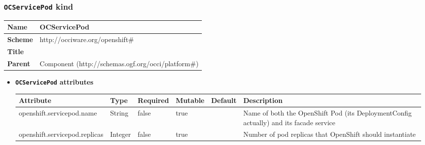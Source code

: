 \subsubsection{\texttt{OCServicePod} kind}
\begin{center}
\begin{tabular}{|l|l|}
  \hline
  \textbf{Name} & OCServicePod \\
  \hline  
  \textbf{Scheme} & http://occiware.org/openshift\# \\
  \hline
  \textbf{Title} &  \\
  \hline
  \textbf{Parent} & Component (http://schemas.ogf.org/occi/platform\#) \\
  \hline
\end{tabular}
\end{center}
\begin{itemize}
\item \textbf{\texttt{OCServicePod} attributes}

\begin{tabularx}{\textwidth}{|l|l|p{1.4cm}|p{1.3cm}|l|X|}
  \hline
  \textbf{Attribute} & \textbf{Type} & \textbf{Required} & \textbf{Mutable} & \textbf{Default} & \textbf{Description} \\
  \hline  
  openshift.servicepod.name & String & false & true &  & Name of both the OpenShift Pod (its DeploymentConfig actually) and its facade service \\
  \hline
  openshift.servicepod.replicas & Integer & false & true &  & Number of pod replicas that OpenShift should instantiate \\
  \hline
\end{tabularx}
\end{itemize}



